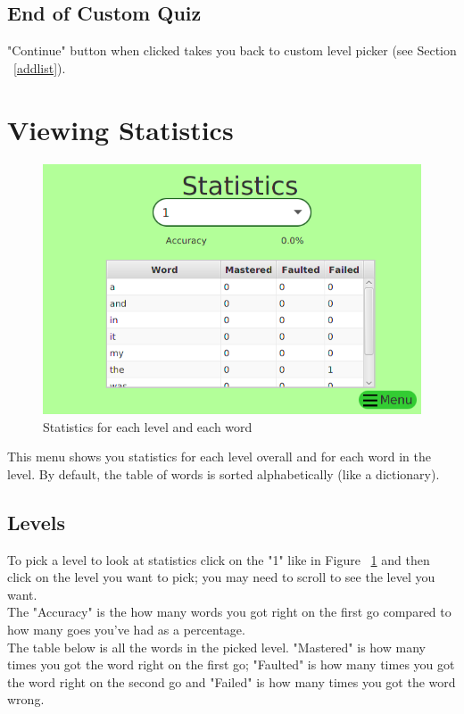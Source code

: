 \documentclass[12pt,a4paper,titlepage,onecolumn]{article}
\begin{document}
	\subsection{End of Custom Quiz}
	"Continue" button when clicked takes you back to custom level picker (see Section ~\ref{addlist}).
	
	\section{Viewing Statistics}
	\begin{figure}[h]
		\centering
		\includegraphics[width=1\linewidth]{Figures/Statistics/StatisticsGeneral}
		\caption[Statistics Menu]{Statistics for each level and each word}
		\label{fig:StatisticsGeneral}
	\end{figure}
	This menu shows you statistics for each level overall and for each word in the level. By default, the table of words is sorted alphabetically (like a dictionary).
	\subsection{Levels}
	To pick a level to look at statistics click on the "1" like in Figure ~\ref{fig:StatisticsGeneral} and then click on the level you want to pick; you may need to scroll to see the level you want.\\ The "Accuracy" is the how many words you got right on the first go compared to how many goes you've had as a percentage. \\The table below is all the words in the picked level. "Mastered" is how many times you got the word right on the first go; "Faulted" is how many times you got the word right on the second go and "Failed" is how many times you got the word wrong.
\end{document}
